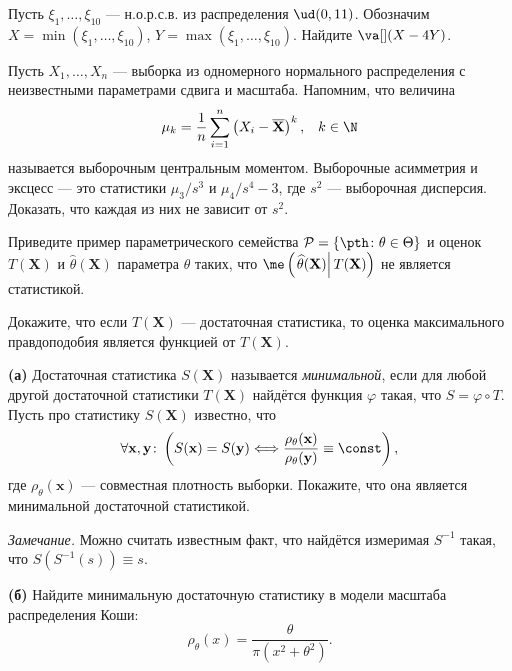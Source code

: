 \begin{problem}[Я.Профи]
    Пусть $\xi_1, \ldots, \xi_{10}$ --- н.о.р.с.в. из распределения $\ud(0, 11)$. Обозначим $X = \min(\xi_1, \ldots, \xi_{10})$, $Y = \max(\xi_1, \ldots, \xi_{10})$. Найдите $\va[](X - 4Y)$.
\end{problem}

\begin{problem}
    Пусть $X_1, \ldots, X_n$ --- выборка из одномерного нормального распределения с неизвестными параметрами сдвига и масштаба. Напомним, что величина
    $$\mu_k = \frac{1}{n}\sum_{i=1}^n\left(X_i - \overline{\mathbf X}\right)^k,\;\;\;k \in \N$$
    называется выборочным центральным моментом. Выборочные асимметрия и эксцесс --- это статистики $\mu_3/s^3$ и $\mu_4 / s^4 - 3$, где $s^2$ --- выборочная дисперсия. Доказать, что каждая из них не зависит от $s^2$.
\end{problem}

\begin{problem}\label{cme_is_not_always_estimator}
    Приведите пример параметрического семейства $\mathcal{P} = \{\pth\colon \theta \in \Theta\}$ и оценок $T(\mathbf X)$ и $\widehat\theta(\mathbf X)$ параметра $\theta$ таких, что $\me\left(\left.\widehat\theta(\mathbf X)\right|T(\mathbf X)\right)$ не является статистикой.
\end{problem}

\begin{problem}
    Докажите, что если $T(\mathbf X)$ --- достаточная статистика, то оценка максимального правдоподобия является функцией от $T(\mathbf X)$.
\end{problem}

\begin{problem}
	\textbf{(а)} Достаточная статистика $S(\mathbf X)$ называется \textit{минимальной}, если для любой другой достаточной статистики $T(\mathbf X)$ найдётся функция $\varphi$ такая, что $S = \varphi \circ T$. Пусть про статистику $S(\mathbf X)$ известно, что 
\[
\forall \mathbf x, \mathbf y\colon \left(S(\mathbf x) = S(\mathbf y) \Longleftrightarrow \frac{\rho_{\theta}(\mathbf x)}{\rho_{\theta}(\mathbf y)} \equiv \const\right),
\]
где $\rho_{\theta}(\mathbf x)$ --- совместная плотность выборки. Покажите, что она является минимальной достаточной статистикой.

\textit{Замечание.} Можно считать известным факт, что найдётся измеримая $S^{-1}$ такая, что $S(S^{-1}(s)) \equiv s$.

\textbf{(б)} Найдите минимальную достаточную статистику в модели масштаба распределения Коши:
\[
\rho_{\theta}(x) = \frac{\theta}{\pi (x^2 + \theta^2)}.
\]
\end{problem}


